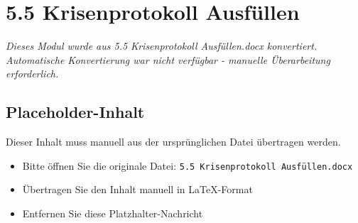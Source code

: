 
\section{5.5 Krisenprotokoll Ausfüllen}
\label{sec:5.5-krisenprotokoll-ausfüllen}

\begin{center}
\textit{Dieses Modul wurde aus 5.5 Krisenprotokoll Ausfüllen.docx konvertiert.\\
Automatische Konvertierung war nicht verfügbar - manuelle Überarbeitung erforderlich.}
\end{center}


\subsection{Placeholder-Inhalt}

Dieser Inhalt muss manuell aus der ursprünglichen Datei übertragen werden.

\begin{itemize}
\item Bitte öffnen Sie die originale Datei: \texttt{5.5 Krisenprotokoll Ausfüllen.docx}
\item Übertragen Sie den Inhalt manuell in LaTeX-Format
\item Entfernen Sie diese Platzhalter-Nachricht
\end{itemize}
